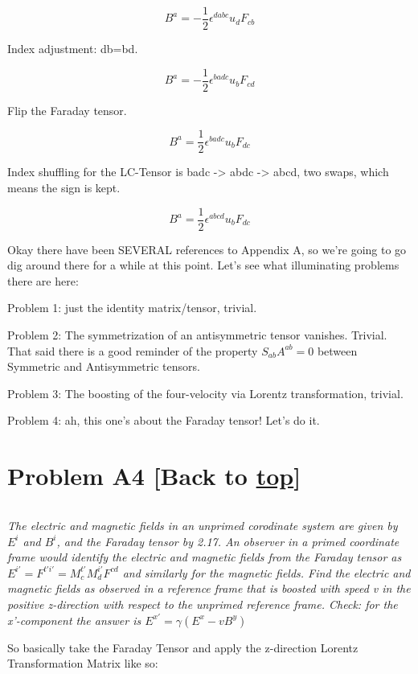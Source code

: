 \documentclass[landscape,letterpaper,10pt,english]{article}
\begin{document}
\[ B^a = - \frac12 \epsilon^{dabc} u_d F_{cb} \]

Index adjustment: db=bd.

\[ B^a = - \frac12 \epsilon^{badc} u_b F_{cd} \]

Flip the Faraday tensor.

\[ B^a = \frac12 \epsilon^{badc} u_b F_{dc} \]

Index shuffling for the LC-Tensor is badc -\textgreater{} abdc
-\textgreater{} abcd, two swaps, which means the sign is kept.

\[ B^a = \frac12 \epsilon^{abcd} u_b F_{dc} \]

    Okay there have been SEVERAL references to Appendix A, so we're going to
go dig around there for a while at this point. Let's see what
illuminating problems there are here:

Problem 1: just the identity matrix/tensor, trivial.

Problem 2: The symmetrization of an antisymmetric tensor vanishes.
Trivial. That said there is a good reminder of the property
\(S_{ab}A^{ab} = 0\) between Symmetric and Antisymmetric tensors.

Problem 3: The boosting of the four-velocity via Lorentz transformation,
trivial.

Problem 4: ah, this one's about the Faraday tensor! Let's do it.

    \hypertarget{problem-a4-back-to-top}{%
\section{\texorpdfstring{Problem A4 {[}Back to
\hyperref[toc]{top}{]}}{Problem A4 {[}Back to {]}}}\label{problem-a4-back-to-top}}

\[\label{A4}\]

\emph{The electric and magnetic fields in an unprimed corodinate system
are given by \(E^i\) and \(B^i\), and the Faraday tensor by 2.17. An
observer in a primed coordinate frame would identify the electric and
magnetic fields from the Faraday tensor as
\(E^{i'}= F^{t'i'} = M^{t'}_c M^{i'}_{d} F^{cd}\) and similarly for the
magnetic fields. Find the electric and magnetic fields as observed in a
reference frame that is boosted with speed v in the positive z-direction
with respect to the unprimed reference frame. Check: for the
x'-component the answer is \(E^{x'} = \gamma(E^x - vB^y)\)}

    So basically take the Faraday Tensor and apply the z-direction Lorentz
Transformation Matrix like so:
\end{document}

